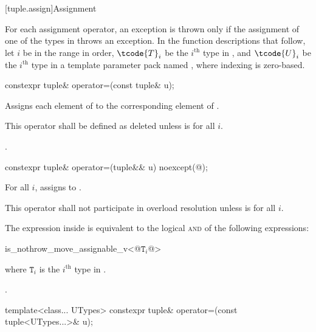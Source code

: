 [tuple.assign]{Assignment}

\pnum
For each  assignment operator, an exception is thrown only if the
assignment of one of the types in  throws an exception.
In the function descriptions that follow, let $i$ be in the range 
in order, $\tcode{T}_i$ be the $i^\text{th}$ type in ,
and $\tcode{U}_i$ be the $i^\text{th}$ type in a
template parameter pack named , where indexing is zero-based.

%
\begin{itemdecl}
constexpr tuple& operator=(const tuple& u);
\end{itemdecl}

\begin{itemdescr}
\pnum
\effects Assigns each element of  to the corresponding
element of .

\pnum
\remarks This operator shall be defined as deleted unless
 is  for all $i$.

\pnum
\returns {}.
\end{itemdescr}

%
\begin{itemdecl}
constexpr tuple& operator=(tuple&& u) noexcept(@\seebelow@);
\end{itemdecl}

\begin{itemdescr}
\pnum
\effects For all $i$, assigns  to
.

\pnum
\remarks This operator shall not participate in overload resolution unless
 is  for all $i$.

\pnum
\remarks The expression inside  is equivalent to the logical \textsc{and} of the
following expressions:

\begin{codeblock}
is_nothrow_move_assignable_v<@$\mathtt{T}_i$@>
\end{codeblock}
where $\mathtt{T}_i$ is the $i^\text{th}$ type in .

\pnum
\returns {}.
\end{itemdescr}

%
\begin{itemdecl}
template<class... UTypes> constexpr tuple& operator=(const tuple<UTypes...>& u);
\end{itemdecl}

